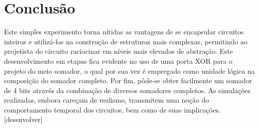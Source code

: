 \documentclass[a4paper]{article}
\begin{document}
\FloatBarrier
\section{Conclusão}
	Este simples experimento torna nítidas as vantagens de se encapsular 
circuitos inteiros e utilizá-los na construção de estruturas mais complexas,
permitindo ao projetista do circuito raciocinar em níveis mais elevados de
abstração. Este desenvolvimento em etapas fica evidente no uso de uma porta
XOR para o projeto do meio somador, o qual por sua vez é empregado como unidade
lógica na composição do somador completo. Por fim, pôde-se obter facilmente
um somador de 4 bits através da combinação de diversos somadores completos.
	As simulações realizadas, embora careçam de realismo, transmitem uma
noção do comportamento temporal dos circuitos, bem como de suas implicações. [desenvolver]
\end{document}
